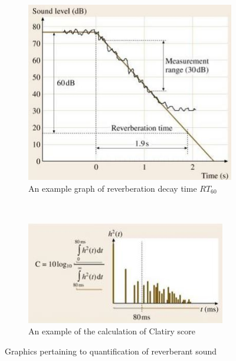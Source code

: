 \documentclass[paper=a4, fontsize=10pt, font=arial]{scrartcl} %
\numberwithin{equation}{section} %
\numberwithin{figure}{section} %
\numberwithin{table}{section} %
\begin{document}
\begin{figure}[H]
\centering
\begin{subfigure}[b]{0.4\textwidth}
\includegraphics[width=\textwidth]{revertimedefinition.jpg}
\centering
\caption{An example graph of reverberation decay time $RT_{60}$}
\end{subfigure}
~
\begin{subfigure}[b]{0.4\textwidth}
\includegraphics[width=\textwidth]{clarityscore.jpg}
\centering
\caption{An example of the calculation of Clatiry score}
\end{subfigure}
\caption{Graphics pertaining to quantification of reverberant sound ~\cite{rossing2007springer}}
\end{figure}
\newpage
\end{document}

